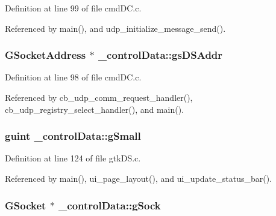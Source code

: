 Definition at line 99 of file cmd\+D\+C.\+c.



Referenced by main(), and udp\+\_\+initialize\+\_\+message\+\_\+send().

\subsubsection[{\texorpdfstring{gs\+D\+S\+Addr}{gsDSAddr}}]{\setlength{\rightskip}{0pt plus 5cm}G\+Socket\+Address $\ast$ \+\_\+control\+Data\+::gs\+D\+S\+Addr}\hypertarget{struct__control_data_a11c618822b208569a5d28206407326d5}{}\label{struct__control_data_a11c618822b208569a5d28206407326d5}


Definition at line 98 of file cmd\+D\+C.\+c.



Referenced by cb\+\_\+udp\+\_\+comm\+\_\+request\+\_\+handler(), cb\+\_\+udp\+\_\+registry\+\_\+select\+\_\+handler(), and main().

\subsubsection[{\texorpdfstring{g\+Small}{gSmall}}]{\setlength{\rightskip}{0pt plus 5cm}guint \+\_\+control\+Data\+::g\+Small}\hypertarget{struct__control_data_aa53ce6d64a23cb93cc0c98e0835b6449}{}\label{struct__control_data_aa53ce6d64a23cb93cc0c98e0835b6449}


Definition at line 124 of file gtk\+D\+S.\+c.



Referenced by main(), ui\+\_\+page\+\_\+layout(), and ui\+\_\+update\+\_\+status\+\_\+bar().

\subsubsection[{\texorpdfstring{g\+Sock}{gSock}}]{\setlength{\rightskip}{0pt plus 5cm}G\+Socket $\ast$ \+\_\+control\+Data\+::g\+Sock}\hypertarget{struct__control_data_a49b267275036fc3ac9b7d9e53b0625e1}{}\label{struct__control_data_a49b267275036fc3ac9b7d9e53b0625e1}


